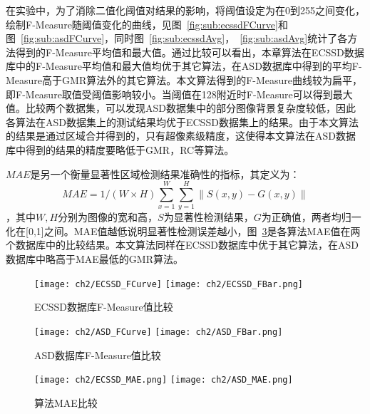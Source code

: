 在实验中，为了消除二值化阈值对结果的影响，将阈值设定为在0到255之间变化，绘制F-Measure随阈值变化的曲线，见图~\ref{fig:sub:ecssdFCurve}和图~\ref{fig:sub:asdFCurve}，同时图~\ref{fig:sub:ecssdAvg}，~\ref{fig:sub:asdAvg}统计了各方法得到的F-Measure平均值和最大值。通过比较可以看出，本章算法在ECSSD数据库中的F-Measure平均值和最大值均优于其它算法，在ASD数据库中得到的平均F-Measure高于GMR算法外的其它算法。本文算法得到的F-Measure曲线较为扁平，即F-Measure取值受阈值影响较小。当阈值在128附近时F-Measure可以得到最大值。比较两个数据集，可以发现ASD数据集中的部分图像背景复杂度较低，因此各算法在ASD数据集上的测试结果均优于ECSSD数据集上的结果。由于本文算法的结果是通过区域合并得到的，只有超像素级精度，这使得本文算法在ASD数据库中得到的结果的精度要略低于GMR，RC等算法。 \par
$MAE$是另一个衡量显著性区域检测结果准确性的指标，其定义为：
$$MAE=1/(W\times H) \sum_{x=1}^W\sum_{y=1}^H \| S(x,y)-G(x,y)\|$$ ，其中$W,H$分别为图像的宽和高，$S$为显著性检测结果，$G$为正确值，两者均归一化在[0,1]之间。MAE值越低说明显著性检测误差越小，图~\ref{fig:MAERst}是各算法MAE值在两个数据库中的比较结果。本文算法同样在ECSSD数据库中优于其它算法，在ASD数据库中略高于MAE最低的GMR算法。\par
\begin{figure}[h]
  \centering%
    {\texttt{[image: ch2/ECSSD\_FCurve]}}%
      {\texttt{[image: ch2/ECSSD\_FBar.png]}}
  \caption{ECSSD数据库F-Measure值比较}
  \label{fig:ECSSDRst}
\end{figure}

\begin{figure}[h]
  \centering%
    {\texttt{[image: ch2/ASD\_FCurve]}}%
      {\texttt{[image: ch2/ASD\_FBar.png]}}
  \caption{ASD数据库F-Measure值比较}
  \label{fig:ASDRst}
\end{figure}

\begin{figure}[h]
  \centering%
    {\texttt{[image: ch2/ECSSD\_MAE.png]}}%
      {\texttt{[image: ch2/ASD\_MAE.png]}}
  \caption{算法MAE比较}
  \label{fig:MAERst}
\end{figure}

